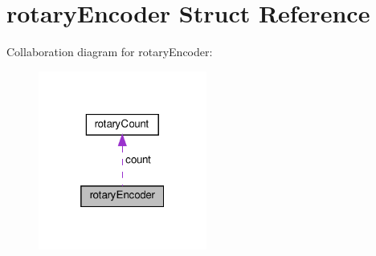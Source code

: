 \hypertarget{structrotaryEncoder}{}\section{rotary\+Encoder Struct Reference}
\label{structrotaryEncoder}


Collaboration diagram for rotary\+Encoder\+:\nopagebreak
\begin{figure}[H]
\begin{center}
\leavevmode
\includegraphics[width=157pt]{structrotaryEncoder__coll__graph}
\end{center}
\end{figure}
